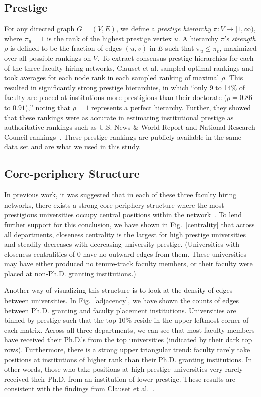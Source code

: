 \documentclass[%
 reprint,
 amsmath,amssymb,
 aps,
]{revtex4-1}
\begin{document}
\subsection{\label{sec:level2}Prestige}
For any directed graph $G = (V, E)$, we define a \emph{prestige hierarchy} $\pi : V \to [1, \infty)$, where $\pi_u = 1$ is the rank of the highest prestige vertex $u$. A hierarchy $\pi$'s \emph{strength} $\rho$ is defined to be the fraction of edges $(u, v)$ in $E$ such that $\pi_u \leq \pi_v$, maximized over all possible rankings on $V$. To extract consensus prestige hierarchies for each of the three faculty hiring networks, Clauset et al. sampled optimal rankings and took averages for each node rank in each sampled ranking of maximal $\rho$. This resulted in significantly strong prestige hierarchies, in which ``only 9 to 14\% of faculty are placed at institutions more prestigious than their doctorate ($\rho = 0.86$ to $0.91$),'' noting that $\rho = 1$ represents a perfect hierarchy. Further, they showed that these rankings were as accurate in estimating institutional prestige as authoritative rankings such as U.S. News \& World Report and National Research Council rankings~\cite{clauset:hiring}. These prestige rankings are publicly available in the same data set and are what we used in this study.

\subsection{\label{sec:level2}Core-periphery Structure}

In previous work, it was suggested that in each of these three faculty hiring networks, there exists a strong core-periphery structure where the most prestigious universities occupy central positions within the network~\cite{clauset:hiring}. To lend further support for this conclusion, we have shown in Fig.~\ref{centrality} that across all departments, closeness centrality is the largest for high prestige universities and steadily decreases with decreasing university prestige. (Universities with closeness centralities of 0 have no outward edges from them. These universities may have either produced no tenure-track faculty members, or their faculty were placed at non-Ph.D. granting institutions.)

Another way of visualizing this structure is to look at the density of edges between universities. In Fig.~\ref{adjacency}, we have shown the counts of edges between Ph.D. granting and faculty placement institutions. Universities are binned by prestige such that the top 10\% reside in the upper leftmost corner of each matrix. Across all three departments, we can see that most faculty members have received their Ph.D.'s from the top universities (indicated by their dark top rows). Furthermore, there is a strong upper triangular trend: faculty rarely take positions at institutions of higher rank than their Ph.D. granting institutions. In other words, those who take positions at high prestige universities very rarely received their Ph.D. from an institution of lower prestige. These results are consistent with the findings from Clauset et al.~\cite{clauset:hiring}.
\end{document}
